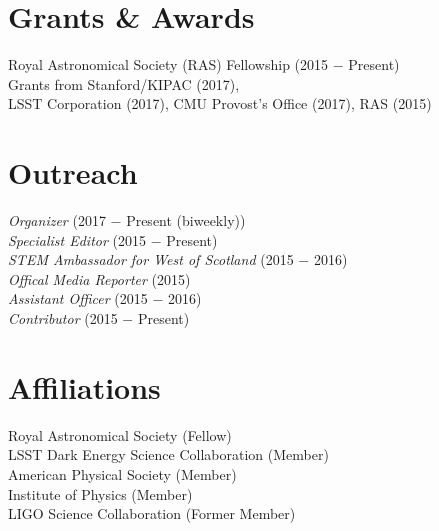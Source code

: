 \documentclass[]{deedy-resume-openfont}
\begin{document}
\begin{minipage}[t]{0.33\textwidth}

\section{\color{Blue} Grants \& Awards} 
\textbullet{} Royal Astronomical Society (RAS) Fellowship (2015 $-$ Present) \\
\textbullet{} Grants from Stanford/KIPAC (2017), \\ LSST Corporation (2017), CMU Provost's Office (2017), RAS (2015)\\
\sectionsep


\section{\color{Blue} Outreach}
 \textit{Organizer} (2017 $-$ Present (biweekly)) \\
 \textit{Specialist Editor} (2015 $-$ Present) \\
 \textit{STEM Ambassador for West of Scotland} (2015 $-$ 2016) \\
 \textit{Offical Media Reporter} (2015) \\
 \textit{Assistant Officer} (2015 $-$ 2016) \\
 \textit{Contributor} (2015 $-$ Present) \\
\sectionsep


\section{\color{Blue} Affiliations} 

Royal Astronomical Society (Fellow)\\
LSST Dark Energy Science Collaboration (Member)\\
American Physical Society (Member) \\
Institute of Physics (Member) \\
LIGO Science Collaboration (Former Member) \\
\sectionsep
%
%

\end{minipage} 
\end{document}
